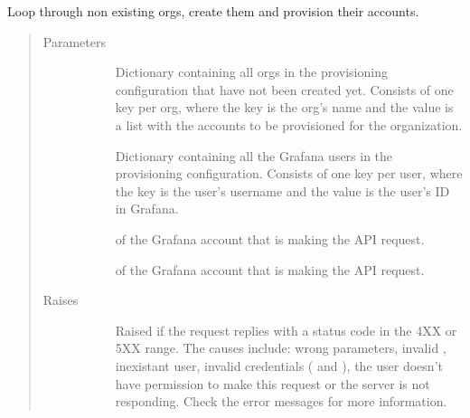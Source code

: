 \documentclass[letterpaper,10pt,english]{sphinxmanual}
\begin{document}
\begin{fulllineitems}
\label{\detokenize{accounts:gpAccounts.createAndReviewOrgs}}
Loop through non existing orgs, create them and provision their accounts.
\begin{quote}\begin{description}
\item[{Parameters}] \leavevmode\begin{description}
\item[{}] \leavevmode{[}\sphinxtitleref{dict}{]}
Dictionary containing all orgs in the provisioning configuration that have
not been created yet. Consists of one key per org, where the key is the
org’s name and the value is a list with the accounts to be provisioned for
the organization.

\item[{}] \leavevmode{[}\sphinxtitleref{dict}{]}
Dictionary containing all the Grafana users in the provisioning 
configuration. Consists of one key per user, where the key is the user’s
username and the value is the user’s ID in Grafana.

\item[{}] \leavevmode{[}\sphinxtitleref{str}{]}
 of the Grafana account that is making the API request.

\item[{}] \leavevmode{[}\sphinxtitleref{str}{]}
 of the Grafana account that is making the API request.

\end{description}

\item[{Raises}] \leavevmode\begin{description}
\item[{}] \leavevmode
Raised if the request replies with a status code in the 4XX or 5XX range.
The causes include: wrong parameters, invalid , inexistant user,
invalid credentials ( and ), the user doesn’t have 
permission to make this request or the server is not responding. Check the
error messages for more information.


\end{description}
\end{description}
\end{quote}
\end{fulllineitems}
\end{document}
